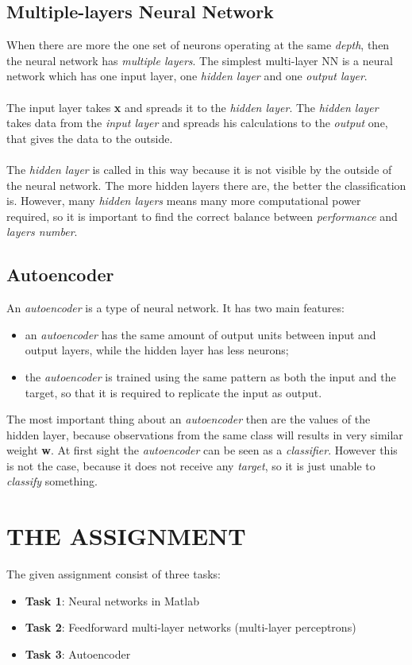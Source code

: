 \documentclass[10pt]{article}
\begin{document}
\subsection{Multiple-layers Neural Network}
When there are more the one set of neurons operating at
the same \textit{depth}, then the neural network has \textit{multiple layers}.
The simplest multi-layer NN is a neural network which has
one input layer, one \textit{hidden layer} and one \textit{output layer}.
\\\\
The input layer takes \textbf{x} and spreads it to the \textit{hidden layer}.
The \textit{hidden layer} takes data from the \textit{input layer} and spreads
his calculations to the \textit{output} one, that gives the data to the
outside.
\\\\
The \textit{hidden layer} is called in this way because it is not
visible by the outside of the neural network. The more hidden
layers there are, the better the classification is. However,
many \textit{hidden layers} means many more computational power
required, so it is important to find the correct balance between
\textit{performance} and \textit{layers number}.
\subsection{Autoencoder}
An \textit{autoencoder} is a type of neural network. It has two main
features:
\begin{itemize}
 \item an \textit{autoencoder} has the same amount of output units
between input and output layers, while the hidden layer has
less neurons;
 \item the \textit{autoencoder} is trained using the same pattern as both
the input and the target, so that it is required to replicate the
input as output.
 \end{itemize} 
 The most important thing about an \textit{autoencoder} then are
the values of the hidden layer, because observations from the
same class will results in very similar weight \textbf{w}. At first sight
the \textit{autoencoder} can be seen as a \textit{classifier}. However this is
not the case, because it does not receive any \textit{target}, so it is
just unable to \textit{classify} something.

\section{THE ASSIGNMENT}
The given assignment consist of three tasks:
\begin{itemize}
 \item \textbf{Task 1}: Neural networks in Matlab
 \item \textbf{Task 2}: Feedforward multi-layer networks (multi-layer perceptrons)
 \item \textbf{Task 3}: Autoencoder
 \end{itemize} 
\end{document}
